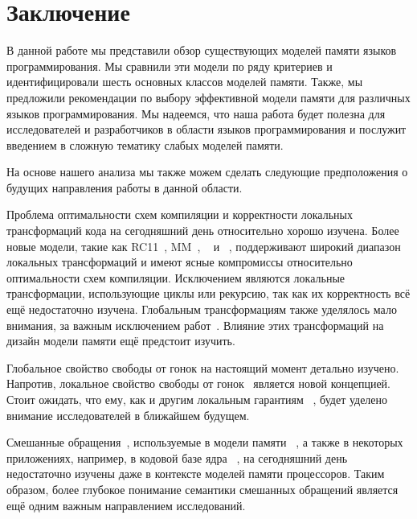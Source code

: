 \section{Заключение}
\label{sec:conclusion}

В данной работе мы представили обзор существующих моделей памяти языков программирования. 
Мы сравнили эти модели  по ряду критериев 
и идентифицировали шесть основных классов моделей памяти. 
Также, мы предложили рекомендации по выбору эффективной модели памяти 
для различных языков программирования. 
Мы надеемся, что наша работа будет полезна 
для исследователей и разработчиков в области языков программирования
и послужит введением в сложную тематику слабых моделей памяти. 


На основе нашего анализа мы также можем сделать следующие предположения 
о будущих направления работы в данной области. 

Проблема оптимальности схем компиляции и корректности локальных трансформаций кода 
на сегодняшний день относительно хорошо изучена.
Более новые модели, такие как 
RC11~\cite{Lahav-al:PLDI17}, \OCaml MM~\cite{Dolan-al:PLDI18},
\Promising~\cite{Kang-al:POPL17,Lee-al:PLDI20}
и \Weakestmo~\cite{Chakraborty-Vafeiadis:POPL19},
поддерживают широкий диапазон локальных трансформаций 
и имеют ясные компромиссы относительно оптимальности схем компиляции. 
Исключением являются  локальные трансформации, 
использующие  циклы или рекурсию, так как их корректность всё ещё недостаточно изучена. 
Глобальным трансформациям также уделялось мало внимания, за важным исключением работ~\cite{PichonPharabod-Sewell:POPL16, Lee-al:PLDI20}.
Влияние этих трансформаций на дизайн модели памяти 
ещё предстоит  изучить.

Глобальное свойство свободы от гонок на настоящий момент детально   изучено. 
Напротив, локальное свойство свободы от гонок~\cite{Dolan-al:PLDI18}  
является новой концепцией. 
Стоит ожидать, что ему, как и другим локальным гарантиям~%
\cite{Dodds-al:ESOP18, Jagadeesan-al:OOPSLA2020, Cho-al:PLDI21}, 
будет уделено  внимание исследователей в ближайшем будущем. 

Смешанные обращения~\cite{Flur-al:POPL17}, 
используемые в модели памяти \JS~\cite{Watt-al:PLDI2020}, 
а также в некоторых приложениях, например, в кодовой базе 
ядра \Linux~\cite{Flur-al:POPL17},
на сегодняшний день недостаточно изучены 
даже в контексте моделей памяти процессоров. 
Таким образом, более глубокое понимание семантики смешанных обращений 
является ещё одним важным направлением исследований. 

